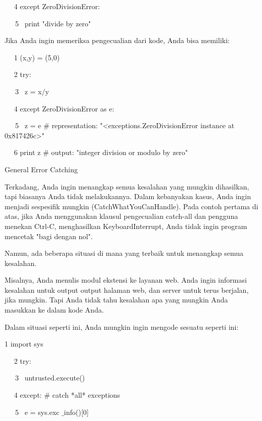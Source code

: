 ~~ 4 except ZeroDivisionError: \par
~~~5~  print "divide by zero" \par
Jika Anda ingin memeriksa pengecualian dari kode, Anda bisa memiliki: \par
\vspace{12pt}
\vspace{12pt}
\vspace{12pt}
~~ 1 (x,y) = (5,0) \par
~~ 2 try: \par
~~~3~  z = x/y \par
~~ 4 except ZeroDivisionError as e: \par
~~~5~  z = e  $  \#  $ representation: "<exceptions.ZeroDivisionError instance at 0x817426c>" \par
~~ 6 print z  $  \#  $ output: "integer division or modulo by zero" \par
\vspace{12pt}
General Error Catching \par
\vspace{12pt}
Terkadang, Anda ingin menangkap semua kesalahan yang mungkin dihasilkan, tapi biasanya Anda tidak melakukannya. Dalam kebanyakan kasus, Anda ingin menjadi sespesifik mungkin (CatchWhatYouCanHandle). Pada contoh pertama di atas, jika Anda menggunakan klausul pengecualian catch-all dan pengguna menekan Ctrl-C, menghasilkan KeyboardInterrupt, Anda tidak ingin program mencetak "bagi dengan nol". \par
\vspace{12pt}
Namun, ada beberapa situasi di mana yang terbaik untuk menangkap semua kesalahan. \par
\vspace{12pt}
Misalnya, Anda menulis modul ekstensi ke layanan web. Anda ingin informasi kesalahan untuk output output halaman web, dan server untuk terus berjalan, jika mungkin. Tapi Anda tidak tahu kesalahan apa yang mungkin Anda masukkan ke dalam kode Anda. \par
\vspace{12pt}
Dalam situasi seperti ini, Anda mungkin ingin mengode sesuatu seperti ini: \par
\vspace{12pt}
 1 import sys \par
~~ 2 try: \par
~~~3~  untrusted.execute() \par
~~ 4 except:  $  \#  $ catch *all* exceptions \par
~~~5~  e = sys.exc $  \_  $info()[0] \par
